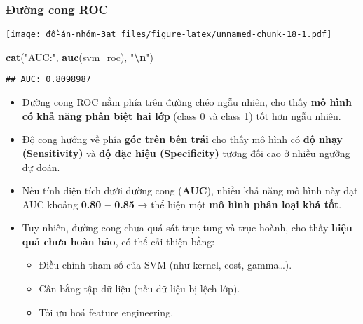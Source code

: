 \documentclass[
]{article}
\newenvironment{Shaded}{\begin{snugshade}}{\end{snugshade}}
\newcommand{\AttributeTok}[1]{\textcolor[rgb]{0.13,0.29,0.53}{#1}}
\newcommand{\ConstantTok}[1]{\textcolor[rgb]{0.56,0.35,0.01}{#1}}
\newcommand{\DecValTok}[1]{\textcolor[rgb]{0.00,0.00,0.81}{#1}}
\newcommand{\FunctionTok}[1]{\textcolor[rgb]{0.13,0.29,0.53}{\textbf{#1}}}
\newcommand{\NormalTok}[1]{#1}
\newcommand{\OtherTok}[1]{\textcolor[rgb]{0.56,0.35,0.01}{#1}}
\newcommand{\SpecialCharTok}[1]{\textcolor[rgb]{0.81,0.36,0.00}{\textbf{#1}}}
\newcommand{\StringTok}[1]{\textcolor[rgb]{0.31,0.60,0.02}{#1}}
\providecommand{\tightlist}{%
  \setlength{\itemsep}{0pt}\setlength{\parskip}{0pt}}
\begin{document}
\subsubsection{Đường cong ROC}\label{sec-svm-roc}

\begin{Shaded}
\end{Shaded}

\texttt{[image: đồ-án-nhóm-3at\_files/figure-latex/unnamed-chunk-18-1.pdf]}

\begin{Shaded}
\begin{Highlighting}[]
\FunctionTok{cat}\NormalTok{(}\StringTok{"AUC:"}\NormalTok{, }\FunctionTok{auc}\NormalTok{(svm\_roc), }\StringTok{"}\SpecialCharTok{\textbackslash{}n}\StringTok{"}\NormalTok{)}
\end{Highlighting}
\end{Shaded}

\begin{verbatim}
## AUC: 0.8098987
\end{verbatim}

\begin{itemize}
\tightlist
\item
  Đường cong ROC nằm phía trên đường chéo ngẫu nhiên, cho thấy
  \textbf{mô hình có khả năng phân biệt hai lớp} (class 0 và class 1)
  tốt hơn ngẫu nhiên.
\item
  Độ cong hướng về phía \textbf{góc trên bên trái} cho thấy mô hình có
  \textbf{độ nhạy (Sensitivity)} và \textbf{độ đặc hiệu (Specificity)}
  tương đối cao ở nhiều ngưỡng dự đoán.
\item
  Nếu tính diện tích dưới đường cong (\textbf{AUC}), nhiều khả năng mô
  hình này đạt AUC khoảng \textbf{0.80 -- 0.85} → thể hiện một
  \textbf{mô hình phân loại khá tốt}.
\item
  Tuy nhiên, đường cong chưa quá sát trục tung và trục hoành, cho thấy
  \textbf{hiệu quả chưa hoàn hảo}, có thể cải thiện bằng:

  \begin{itemize}
  \tightlist
  \item
    Điều chỉnh tham số của SVM (như kernel, cost, gamma\ldots).
  \item
    Cân bằng tập dữ liệu (nếu dữ liệu bị lệch lớp).
  \item
    Tối ưu hoá feature engineering.
  \end{itemize}
\end{itemize}
\end{document}
